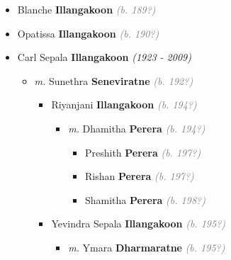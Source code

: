 \documentclass[10pt, openany]{book}
\begin{document}
\begin{itemize}
{\begin{itemize}
{\begin{itemize}
{\begin{itemize}
{\begin{itemize}
{\begin{itemize}
\item{Pani \textbf{Illangakoon} \textcolor{gray}{\textit{(b. 195?)}}
 }
\end{itemize}}
\end{itemize}
 }
\item{Surangani \textbf{Illangakoon} \textcolor{gray}{\textit{(b. 192?)}}
 }
\end{itemize}}
\end{itemize}
 }
\item{Blanche \textbf{Illangakoon} \textcolor{gray}{\textit{(b. 189?)}}
 }
\item{Opatissa \textbf{Illangakoon} \textcolor{gray}{\textit{(b. 190?)}}
 }
\item{Carl Sepala \textbf{Illangakoon} \textcolor{slorange}{\textit{(1923 - 2009)}}
\begin{itemize}
\item{\textit{m.} Sunethra \textbf{Seneviratne} \textcolor{gray}{\textit{(b. 192?)}}   \label{couple:00001477:00001478} \begin{itemize}
\item{Riyanjani \textbf{Illangakoon} \textcolor{gray}{\textit{(b. 194?)}}
\begin{itemize}
\item{\textit{m.} Dhamitha \textbf{Perera} \textcolor{gray}{\textit{(b. 194?)}}   \label{couple:00001483:00001484} \begin{itemize}
\item{Preshith \textbf{Perera} \textcolor{gray}{\textit{(b. 197?)}}
 }
\item{Rishan \textbf{Perera} \textcolor{gray}{\textit{(b. 197?)}}
 }
\item{Shamitha \textbf{Perera} \textcolor{gray}{\textit{(b. 198?)}}
 }
\end{itemize}}
\end{itemize}
 }
\item{Yevindra Sepala \textbf{Illangakoon} \textcolor{gray}{\textit{(b. 195?)}}
\begin{itemize}
\item{\textit{m.} Ymara \textbf{Dharmaratne} \textcolor{gray}{\textit{(b. 195?)}}   \label{couple:00001479:00001480} \begin{itemize}

\end{itemize}}
\end{itemize}}
\end{itemize}}
\end{itemize}}
\end{itemize}}
\end{itemize}
\end{document}
